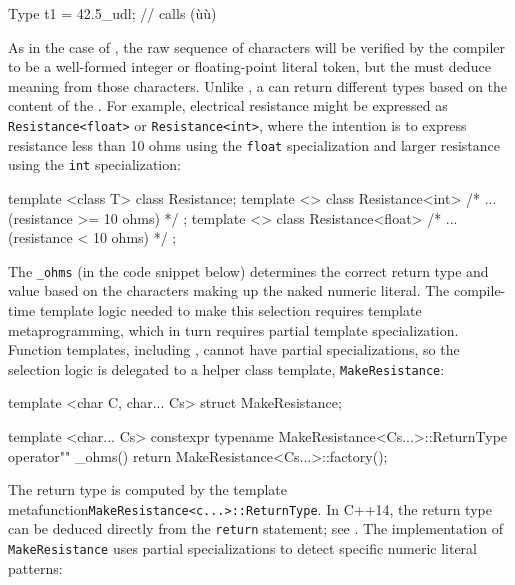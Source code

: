 \begin{emcppslisting}[emcppsbatch=e12]
Type t1 = 42.5_udl;  // calls (ù{}ù)
\end{emcppslisting}
    
\noindent As in the case of , the raw sequence of
characters will be verified by the compiler to be a well-formed integer
or floating-point literal token, but the  must
deduce meaning from those characters. Unlike ,
a  can return different types based on
the content of the . For example, electrical
resistance might be expressed as \lstinline!Resistance<float>! or
\lstinline!Resistance<int>!, where the intention is to express resistance
less than 10 ohms using the \lstinline!float! specialization and larger
resistance using the \lstinline!int! specialization:

\begin{emcppslisting}[emcppsbatch=e12]
template <class T> class Resistance;
template <> class Resistance<int>   { /* ... (resistance >= 10 ohms) */ };
template <> class Resistance<float> { /* ... (resistance <  10 ohms) */ };
\end{emcppslisting}
    
\noindent The \lstinline!_ohms!  (in the code snippet below) determines the correct
return type and value based on the characters making up the naked
numeric literal. The compile-time template logic needed to make this
selection requires template metaprogramming, which in turn requires
partial template specialization. Function templates, including
, cannot have partial specializations,
so the selection logic is delegated to a helper class template,
\lstinline!MakeResistance!:

\begin{emcppslisting}[emcppsbatch=e12]
template <char C, char... Cs> struct MakeResistance;

template <char... Cs>
constexpr typename MakeResistance<Cs...>::ReturnType
operator"" _ohms() { return MakeResistance<Cs...>::factory(); }
\end{emcppslisting}
    
\noindent The return type is computed by the template metafunction\linebreak[4]%
\lstinline!MakeResistance<c...>::ReturnType!. In C++14, the return type can
be deduced directly from the \lstinline!return! statement; see .
The implementation of \lstinline!MakeResistance! uses partial
specializations to detect specific numeric literal patterns:

